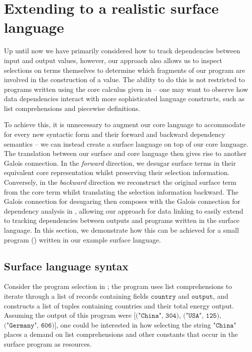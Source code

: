 \section{Extending to a realistic surface language}
\label{sec:surface-language}

Up until now we have primarily considered how to track dependencies between input and output values, however, our approach also allows us to inspect selections on terms themselves to determine which fragments of our program are involved in the construction of a value. The ability to do this is not restricted to programs written using the core calculus given in  -- one may want to observe how data dependencies interact with more sophisticated language constructs, such as list comprehensions and piecewise definitions.

To achieve this, it is unnecessary to augment our core language to accommodate for every new syntactic form and their forward and backward dependency semantics -- we can instead create a surface language on top of our core language. The translation between our surface and core language then gives rise to another Galois connection. In the \textit{forward} direction, we desugar surface terms in their equivalent core representation whilst preserving their selection information. Conversely, in the \textit{backward} direction we reconstruct the original surface term from the core term whilst translating the selection information backward. The Galois connection for desugaring then composes with the Galois connection for dependency analysis in , allowing our approach for data linking to easily extend to tracking dependencies between outputs and programs written in the surface language. In this section, we demonstrate how this can be achieved for a small program () written in our example surface language.



\subsection{Surface language syntax}

Consider the program selection in ; the program uses list comprehensions to iterate through a list of records containing fields $\texttt{country}$ and $\texttt{output}$, and constructs a list of tuples containing countries and their total energy output. Assuming the output of this program were $\texttt{[("China", 304), ("USA", 125),}$ $\texttt{("Germany", 606)]}$, one could be interested in how selecting the string $\texttt{"China"}$ places a demand on list comprehensions and other constants that occur in the surface program as resources.

